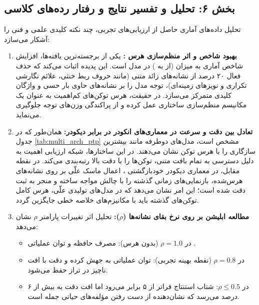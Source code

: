 \subsection*{بخش ۶: تحلیل و تفسیر نتایج و رفتار رده‌های کلاسی }
تحلیل داده‌های آماری حاصل از ارزیابی‌های تجربی، چند نکته کلیدی علمی و فنی را آشکار می‌سازد:

\begin{enumerate}
    \item \textbf{بهبود شاخص  و اثر منظم‌سازی هرس :}
    یکی از برجسته‌ترین یافته‌ها، افزایش شاخص آماری  به میزان  (از  به ) در مدل  است. این پدیده اثبات می‌کند که حذف فعال ۲۰ درصد از نشانه‌های زائد متنی (مانند حروف ربط خنثی، علائم نگارشی تکراری و نویزهای زمینه‌ای)، توجه مدل را بر نشانه‌های حاوی بار حسی و واژگان کلیدی متمرکز می‌سازد. در حقیقت، هرس توکن‌های کم‌اهمیت به عنوان یک مکانیسم منظم‌سازی ساختاری عمل کرده و از پراکندگی وزن‌های توجه  جلوگیری می‌نماید.
    
    \item \textbf{تعادل بین دقت و سرعت در معماری‌های انکودر در برابر دیکودر:}
    همان‌طور که در جدول \ref{tab:multi_arch_ptp} مشخص است، مدل‌های دوطرفه  مانند  بیشترین سازگاری را با هرس توکن نشان می‌دهند. در این ساختارها، شبکه ارزیابی اهمیت به دلیل دسترسی به تمام بافت متنی، توکن‌ها را با دقت بالا رتبه‌بندی می‌کند. در نقطه مقابل، در معماری دیکودر خودبازگشتی ، اعمال ماسک علّی بر روی نشانه‌های هرس‌شده، بازنمایی‌های زمانی گذشته را با چالش مواجه ساخته و منجر به ثبت دقت  شده است؛ این امر نشان می‌دهد که در مدل‌های تولیدی علّی، هرس کامل توکن‌های گذشته باید با مکانیزم‌های خلاصه خطی جایگزین گردد.
    
    \item \textbf{مطالعه ابلیشن  بر روی نرخ بقای نشانه‌ها ($\rho$):}
    تحلیل اثر تغییرات پارامتر $\rho$ نشان می‌دهد:
    \begin{itemize}
        \item در $\rho = 1.0$ (بدون هرس): مصرف حافظه  و توان عملیاتی .
        \item در $\rho = 0.8$ (نقطه بهینه تجربی): توان عملیاتی به  جهش کرده و دقت با افت ناچیز  در تراز  حفظ می‌شود.
        \item در $\rho \le 0.5$: شتاب استنتاج فراتر از ۵ برابر می‌رود اما افت دقت به بیش از ۶ درصد می‌رسد که نشان‌دهنده از دست رفتن مؤلفه‌های حیاتی جمله است.
    \end{itemize}
\end{enumerate}

